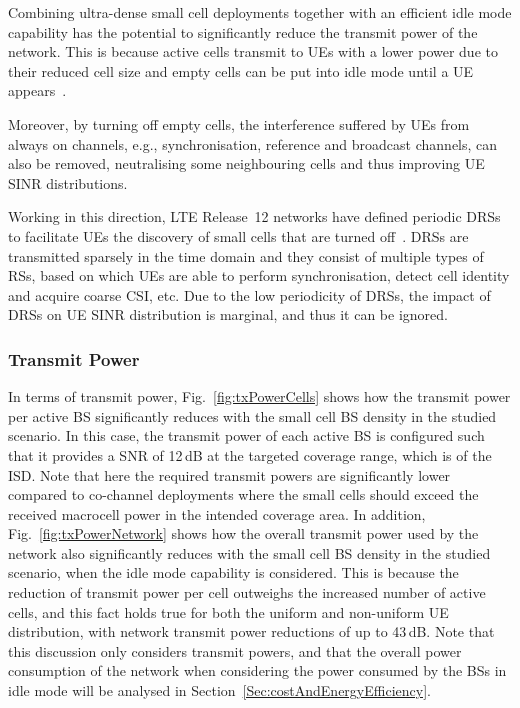 \documentclass{IEEEtran}
\begin{document}
Combining ultra-dense small cell deployments together with an efficient idle mode capability
has the potential to significantly reduce the transmit power of the network.
This is because active cells transmit to \acp{UE} with a lower power due to their reduced cell size
and empty cells can be put into idle mode until a \ac{UE} appears~\cite{Ashraf:10a}.

Moreover, by turning off empty cells,
the interference suffered by \acp{UE} from always on channels, e.g., synchronisation, reference and broadcast channels,
can also be removed,
neutralising some neighbouring cells and thus improving  \ac{UE} \ac{SINR} distributions.


Working in this direction,
\ac{LTE} Release~12 networks have defined
periodic \acp{DRS} to facilitate \acp{UE} the discovery of small cells that are turned off~\cite{LTE-R12}.
\acp{DRS} are transmitted sparsely in the time domain and they consist of multiple types of \acp{RS},
based on which \acp{UE} are able to perform synchronisation, detect cell identity and acquire coarse \ac{CSI}, etc.
Due to the low periodicity of \acp{DRS},
the impact of \acp{DRS} on \ac{UE} \ac{SINR} distribution is marginal, and thus it can be ignored.


\subsubsection{Transmit Power}

In terms of transmit power,
Fig.~\ref{fig:txPowerCells} shows how the transmit power per active \ac{BS} significantly reduces with the small cell \ac{BS} density in the studied scenario.
In this case,
the transmit power of each active \ac{BS} is configured such that it provides a \ac{SNR} of 12\,dB at the targeted coverage range,
which is  of the \ac{ISD}.
Note that here the required transmit powers are significantly lower compared to co-channel deployments where the small cells should exceed the received macrocell power in the intended coverage area.
In addition, Fig.~\ref{fig:txPowerNetwork} shows how the overall transmit power used by the network also significantly reduces with the small cell \ac{BS} density in the studied scenario,
when the idle mode capability is considered.
This is because the reduction of transmit power per cell outweighs the increased number of active cells,
and this fact holds true for both the uniform and non-uniform \ac{UE} distribution,
with network transmit power reductions of up to 43\,dB.
Note that this discussion only considers transmit powers,
and that the overall power consumption of the network when considering the power consumed by the \acp{BS} in idle mode
will be analysed in Section~\ref{Sec:costAndEnergyEfficiency}.
\end{document}
